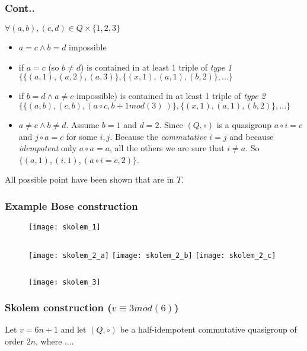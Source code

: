\begin{frame}
\frametitle{Cont..}
$\forall (a,b),(c,d) \in Q \times \{1,2,3\}$
\begin{itemize}
	\item $a=c \wedge b=d$ impossible
	\item if $a=c$ (so $b\not = d$) is contained in at least 1 triple of \textit{type 1} $\{\{(a,1),(a,2),(a,3)\}, \{(x,1),(a,1),(b,2)\}, ... \}$
	\item if $b=d \wedge a \not = c$ impossible) is contained in at least 1 triple of \textit{type 2} $\{\{(a,b),(c,b),(a \circ c, b+1 mod(3)\ )\}, \{(x,1),(a,1),(b,2)\}, ... \}$
	\item $a \not = c \wedge b \not = d$.%
	Assume $b=1$ and $d=2$. Since $(Q,\circ)$ is a quasigroup $a \circ i = c$ and $j \circ a = c$ for some $i,j$. Because the \textit{commutative} $i=j$ and because \textit{idempotent} only $a \circ a=a$, all the others we are sure that $i\not = a$. So $\{(a,1),(i,1),(a \circ i = c, 2)\}$.
\end{itemize}

All possible point have been shown that are in $T$.
\end{frame}

\begin{frame}
\frametitle{Example Bose construction}
\begin{figure}
	\texttt{[image: skolem\_1]}
	\begin{columns}
		\texttt{[image: skolem\_2\_a]}
		\texttt{[image: skolem\_2\_b]}
		\texttt{[image: skolem\_2\_c]}
	\end{columns}
	\texttt{[image: skolem\_3]}
\end{figure}
\end{frame}

\begin{frame}
\frametitle{Skolem construction ($v \equiv 3 mod(6)$)}
Let $v = 6n +1$ and let $(Q, \circ)$ be a half-idempotent commutative quasigroup of order $2n$, where ....
\end{frame}




